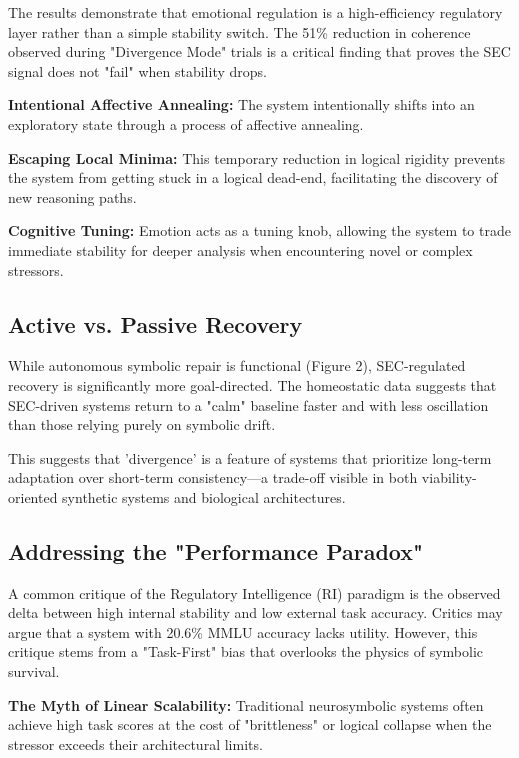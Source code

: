 \documentclass[11pt]{article}
\begin{document}
The results demonstrate that emotional regulation is a high-efficiency regulatory layer rather than a simple stability switch. The 51\% reduction in coherence observed during "Divergence Mode" trials is a critical finding that proves the SEC signal does not "fail" when stability drops.

\textbf{Intentional Affective Annealing:} The system intentionally shifts into an exploratory state through a process of affective annealing.

\textbf{Escaping Local Minima:} This temporary reduction in logical rigidity prevents the system from getting stuck in a logical dead-end, facilitating the discovery of new reasoning paths.

\textbf{Cognitive Tuning:} Emotion acts as a tuning knob, allowing the system to trade immediate stability for deeper analysis when encountering novel or complex stressors.

\subsection{Active vs. Passive Recovery}
While autonomous symbolic repair is functional (Figure 2), SEC-regulated recovery is significantly more goal-directed. The homeostatic data suggests that SEC-driven systems return to a "calm" baseline faster and with less oscillation than those relying purely on symbolic drift. 

This suggests that 'divergence' is a feature of systems that prioritize long-term adaptation over short-term consistency—a trade-off visible in both viability-oriented synthetic systems and biological architectures.

\subsection{Addressing the "Performance Paradox"}

A common critique of the Regulatory Intelligence (RI) paradigm is the observed delta between high internal stability and low external task accuracy. Critics may argue that a system with 20.6\% MMLU accuracy lacks utility. However, this critique stems from a "Task-First" bias that overlooks the physics of symbolic survival.

\textbf{The Myth of Linear Scalability:} Traditional neurosymbolic systems often achieve high task scores at the cost of "brittleness" or logical collapse when the stressor exceeds their architectural limits.
\end{document}
